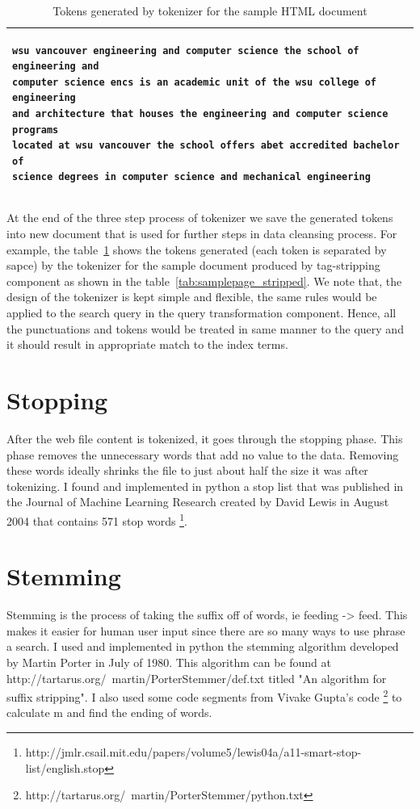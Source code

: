 \documentclass[letterpaper,11pt,twoside]{article}
\begin{document}
\begin{table}[htb]
\centering
\begin{tabular}{|p{\textwidth}|}
\hline
\begin{verbatim}
wsu vancouver engineering and computer science the school of engineering and
computer science encs is an academic unit of the wsu college of engineering
and architecture that houses the engineering and computer science programs
located at wsu vancouver the school offers abet accredited bachelor of
science degrees in computer science and mechanical engineering
\end{verbatim}\\
\hline
\end{tabular}
\caption{Tokens generated by tokenizer for the sample HTML document}
\label{tab:samplepage_tokenized}
\end{table}

At the end of the three step process of tokenizer we save the generated tokens into new document that is used for further steps in data cleansing process. For example, the table~\ref{tab:samplepage_tokenized} shows the tokens generated (each token is separated by sapce) by the tokenizer for the sample document produced by tag-stripping component as shown in the table~\ref{tab:samplepage_stripped}. We note that, the design of the tokenizer is kept simple and flexible, the same rules would be applied to the search query in the query transformation component. Hence, all the punctuations and tokens would be treated in same manner to the query and it should result in appropriate match to the index terms. 

\section{Stopping}
After the web file content is tokenized, it goes through the stopping phase. This phase removes the unnecessary words that add no value to the data. Removing these words ideally shrinks the file to just about half the size it was after tokenizing. I found and implemented in python a stop list that was published in the Journal of Machine Learning Research created by David Lewis in August 2004 that contains 571 stop words \footnote{http://jmlr.csail.mit.edu/papers/volume5/lewis04a/a11-smart-stop-list/english.stop}.

\section{Stemming}
Stemming is the process of taking the suffix off of words, ie feeding -> feed. This makes it easier for human user input since there are so many ways to use phrase a search. I used and implemented in python the stemming algorithm developed by Martin Porter in July of 1980. This algorithm can be found at http://tartarus.org/~martin/PorterStemmer/def.txt  titled "An algorithm for suffix stripping".  I also used some code segments from Vivake Gupta’s code \footnote{http://tartarus.org/~martin/PorterStemmer/python.txt} to calculate m and find the ending of words.
\end{document}
